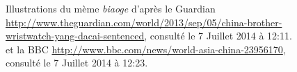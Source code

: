 \begin{figure}[h!]
    \hspace{\fill}%
    \hspace{\fill}%
    \hspace{\fill}%
    \caption{ 
      Illustrations du mème \textit{biaoge} d'après le Guardian \url{http://www.theguardian.com/world/2013/sep/05/china-brother-wristwatch-yang-dacai-sentenced}, consulté le 7 Juillet 2014 à 12:11. et la BBC \url{http://www.bbc.com/news/world-asia-china-23956170}, consulté le 7 Juillet 2014 à 12:23.
    }
\end{figure}

